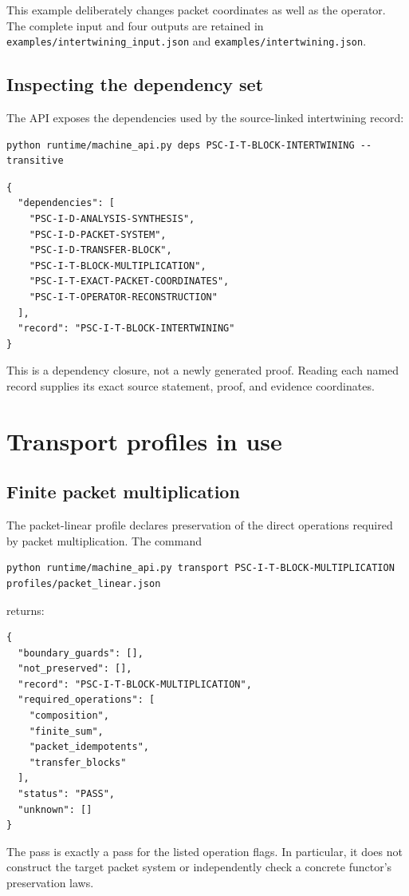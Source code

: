 \documentclass[a4paper,11pt]{article}
\begin{document}
This example deliberately changes packet coordinates as well as the operator. The complete input and four outputs are retained in \nolinkurl{examples/intertwining_input.json} and \nolinkurl{examples/intertwining.json}.
\subsection{Inspecting the dependency set}
The API exposes the dependencies used by the source-linked intertwining record:
\begin{lstlisting}
python runtime/machine_api.py deps PSC-I-T-BLOCK-INTERTWINING --transitive
\end{lstlisting}

\begin{lstlisting}
{
  "dependencies": [
    "PSC-I-D-ANALYSIS-SYNTHESIS",
    "PSC-I-D-PACKET-SYSTEM",
    "PSC-I-D-TRANSFER-BLOCK",
    "PSC-I-T-BLOCK-MULTIPLICATION",
    "PSC-I-T-EXACT-PACKET-COORDINATES",
    "PSC-I-T-OPERATOR-RECONSTRUCTION"
  ],
  "record": "PSC-I-T-BLOCK-INTERTWINING"
}
\end{lstlisting}

This is a dependency closure, not a newly generated proof. Reading each named record supplies its exact source statement, proof, and evidence coordinates.

\section{Transport profiles in use}
\subsection{Finite packet multiplication}
The packet-linear profile declares preservation of the direct operations required by packet multiplication. The command
\begin{lstlisting}
python runtime/machine_api.py transport PSC-I-T-BLOCK-MULTIPLICATION profiles/packet_linear.json
\end{lstlisting}
returns:

\begin{lstlisting}
{
  "boundary_guards": [],
  "not_preserved": [],
  "record": "PSC-I-T-BLOCK-MULTIPLICATION",
  "required_operations": [
    "composition",
    "finite_sum",
    "packet_idempotents",
    "transfer_blocks"
  ],
  "status": "PASS",
  "unknown": []
}
\end{lstlisting}

The pass is exactly a pass for the listed operation flags. In particular, it does not construct the target packet system or independently check a concrete functor's preservation laws.
\end{document}
